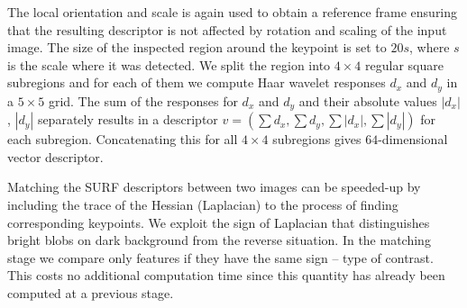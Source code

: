 The local orientation and scale is again used to obtain a reference frame ensuring that the resulting descriptor is not affected by rotation and scaling of the input image. 
The size of the inspected region around the keypoint is set to $20s$, where $s$ is the scale where it was detected. 
We split the region into $4 \times 4$ regular square subregions and for each of them we compute Haar wavelet responses $d_x$ and $d_y$
in a $5 \times 5$ grid.  
The sum of the responses for $d_x$ and $d_y$ and their absolute values $|d_x|$, $|d_y|$ separately results in a descriptor $v = (\sum{d_x}, \sum{d_y}, \sum{|d_x|}, \sum{|d_y|})$ for each subregion.
Concatenating this for all $4 \times 4$ subregions gives $64$-dimensional vector descriptor.

Matching the SURF descriptors between two images can be speeded-up by including the trace of the Hessian (Laplacian) to the process of finding corresponding keypoints.
We exploit the sign of Laplacian that distinguishes bright blobs on dark background from the reverse situation.
In the matching stage we compare only features if they have the same sign -- type of contrast. 
This costs no additional computation time since this quantity has already been computed at a previous stage.

